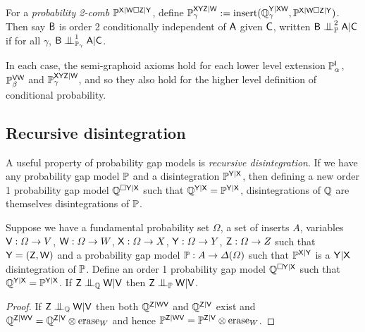 \begin{definition}
For a \emph{probability 2-comb} $\mathbb{P}^{\mathsf{X}|\mathsf{W}\square\mathsf{Z}|\mathsf{Y}}$, define $\mathbb{P}_\gamma^{\mathsf{XYZ}|\mathsf{W}}:=\text{insert}(\mathbb{Q}_\gamma^{\mathsf{Y}|\mathsf{XW}}, \mathbb{P}^{\mathsf{X}|\mathsf{W}\square\mathsf{Z}|\mathsf{Y}})$. Then say $\mathsf{B}$ is order 2 conditionally independent of $\mathsf{A}$ given $\mathsf{C}$, written $\RV{B}\CI_{\prob{P}}^2\RV{A}|\RV{C}$ if for all $\gamma$, $\RV{B}\CI^1_{\prob{P}_\gamma}\RV{A}|\RV{C}$.
\end{definition}

In each case, the semi-graphoid axioms hold for each lower level extension $\mathbb{P}^{\mathsf{I}}_\alpha$, $\mathbb{P}^{\mathsf{VW}}_\beta$ and $\mathbb{P}_\gamma^{\mathsf{XYZ}|\mathsf{W}}$, and so they also hold for the higher level definition of conditional probability.


\subsection{Recursive disintegration}

A useful property of probability gap models is \emph{recursive disintegration}. If we have any probability gap model $\mathbb{P}$ and a disintegration $\mathbb{P}^{\mathsf{Y}|\mathsf{X}}$, then defining a new order 1 probability gap model $\mathbb{Q}^{\square\mathsf{Y}|\mathsf{X}}$ such that $\mathbb{Q}^{\mathsf{Y}|\mathsf{X}}=\mathbb{P}^{\mathsf{Y}|\mathsf{X}}$, disintegrations of $\mathbb{Q}$ are themselves disintegrations of $\mathbb{P}$.


\begin{corollary}
Suppose we have a fundamental probability set $\Omega$, a set of inserts $A$, variables $\mathsf{V}:\Omega\to V$, $\mathsf{W}:\Omega\to W$, $\mathsf{X}:\Omega\to X$, $\mathsf{Y}:\Omega\to Y$, $\mathsf{Z}:\Omega\to Z$ such that $\mathsf{Y}=(\mathsf{Z},\mathsf{W})$ and a probability gap model $\mathbb{P}:A\to \Delta(\Omega)$ such that $\mathbb{P}^{\mathsf{X}|\mathsf{Y}}$ is a $\mathsf{Y}|\mathsf{X}$ disintegration of $\mathbb{P}$. Define an order 1 probability gap model $\mathbb{Q}^{\square \mathsf{Y}|\mathsf{X}}$ such that $\mathbb{Q}^{\mathsf{Y}|\mathsf{X}}=\mathbb{P}^{\mathsf{Y}|\mathsf{X}}$. If $\RV{Z}\CI_{\prob{Q}}\RV{W}|\RV{V}$ then $\RV{Z}\CI_{\prob{P}}\RV{W}|\RV{V}$.
\end{corollary}

\begin{proof}
If $\RV{Z}\CI_{\prob{Q}}\RV{W}|\RV{V}$ then both $\mathbb{Q}^{\mathsf{Z}|\mathsf{WV}}$ and $\mathbb{Q}^{\mathsf{Z}|\mathsf{V}}$ exist and $\mathbb{Q}^{\mathsf{Z}|\mathsf{WV}}=\mathbb{Q}^{\mathsf{Z}|\mathsf{V}}\otimes\text{erase}_{W}$ and hence $\mathbb{P}^{\mathsf{Z}|\mathsf{WV}}=\mathbb{P}^{\mathsf{Z}|\mathsf{V}}\otimes\text{erase}_{W}$.
\end{proof}

